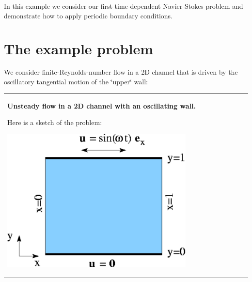 In this example we consider our first time-\/dependent Navier-\/\+Stokes problem and demonstrate how to apply periodic boundary conditions.



\hypertarget{index_example}{}\section{The example problem}\label{index_example}
We consider finite-\/\+Reynolds-\/number flow in a 2D channel that is driven by the oscillatory tangential motion of the \char`\"{}upper\char`\"{} wall\+:

\begin{center} \tabulinesep=1mm
\begin{longtabu} spread 0pt [c]{*{1}{|X[-1]}|}
\hline
\begin{center} {\bfseries Unsteady flow in a 2D channel with an oscillating wall.} \end{center}  Here is a sketch of the problem\+:

 
\begin{DoxyImage}
\includegraphics[width=0.75\textwidth]{rayleigh_channel}
\end{DoxyImage}



\end{longtabu}
\end{center}
